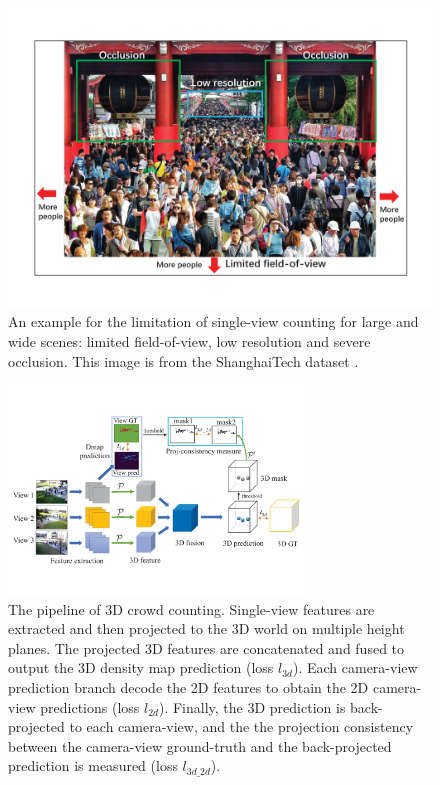 \documentclass[letterpaper]{article} %
\newcommand{\citep}{\cite}
\begin{document}
\begin{figure}[t]
\centering
   \includegraphics[width=0.95\columnwidth]{Fig_3examples.pdf}
   \caption{An example for the limitation of single-view counting for large and wide scenes: limited field-of-view, low resolution and severe occlusion. This image is from the ShanghaiTech dataset \citep{zhang2015cross}.
   }
\label{fig:example}
\end{figure}

\begin{figure}[t]
\centering
   \includegraphics[width=0.7\textwidth]{Fig_pipeline.pdf}
   \caption{The pipeline of 3D crowd counting. Single-view features are extracted and then projected to the 3D world on multiple height planes. The projected 3D features are concatenated and fused to output the 3D density map prediction (loss $l_{3d}$). Each camera-view prediction branch decode the 2D features to obtain the 2D camera-view predictions (loss $l_{2d}$). Finally, the 3D prediction is back-projected to each camera-view, and the the projection consistency between the camera-view ground-truth and the back-projected prediction %
   is measured (loss $l_{3d\_2d}$).}
\label{fig:pipeline}
\end{figure}
\end{document}
